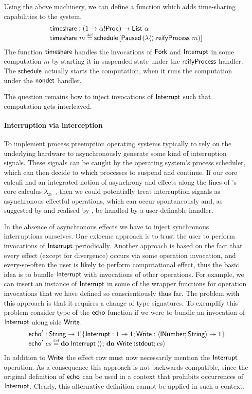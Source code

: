 \documentclass[12pt,phd,lfcs,twoside,openright,logo,leftchapter,normalheadings]{infthesis}
\theoremstyle{plain}
\theoremstyle{definition}
\begin{document}
%
Using the above machinery, we can define a function which adds
time-sharing capabilities to the system.
%
\[
  \bl
     \timeshare : (\UnitType \to \alpha \eff \Proc) \to \List~\alpha\\
     \timeshare~m \defas \schedule\,[\Suspended\,(\lambda\Unit.\reifyP~m)]
  \el
\]
%
The function $\mathsf{timeshare}$ handles the invocations of $\mathsf{Fork}$ and
$\mathsf{Interrupt}$ in some computation $m$ by starting it in suspended state
under the $\mathsf{reifyProcess}$ handler. The $\mathsf{schedule}$ actually starts the
computation, when it runs the computation under the $\mathsf{nondet}$ handler.
%

The question remains how to inject invocations of $\mathsf{Interrupt}$ such
that computation gets interleaved.

\paragraph{Interruption via interception}
%
To implement process preemption operating systems typically to rely on
the underlying hardware to asynchronously generate some kind of
interruption signals. These signals can be caught by the operating
system's process scheduler, which can then decide to which processes
to suspend and continue.
%
If our core calculi had an integrated notion of asynchrony and effects
along the lines of \citeauthor{AhmanP20}'s core calculus
$\lambda_{\text{\ae}}$~\cite{AhmanP20}, then we could potentially
treat interruption signals as asynchronous effectful operations, which
can occur spontaneously and, as suggested by \citet{DolanEHMSW17} and
realised by \citet{Poulson20}, be handled by a user-definable handler.
%

In the absence of asynchronous effects we have to inject synchronous
interruptions ourselves.
%
One extreme approach is to trust the user to perform invocations of
$\mathsf{Interrupt}$ periodically.
%
Another approach is based on the fact that every effect (except for
divergence) occurs via some operation invocation, and every-so-often
the user is likely to perform computational effect, thus the basic
idea is to bundle $\mathsf{Interrupt}$ with invocations of other
operations. For example, we can insert an instance of $\mathsf{Interrupt}$ in
some of the wrapper functions for operation invocations that we have
defined so conscientiously thus far. The problem with this approach is
that it requires a change of type signatures. To exemplify this
problem consider type of the $\mathsf{echo}$ function if we were to bundle an
invocation of $\mathsf{Interrupt}$ along side $\mathsf{Write}$.
%
\[
  \bl
    \echo' : \String \to \UnitType \eff \{\Interrupt : \UnitType \opto \UnitType;\Write : \Record{\UFD;\String} \opto \UnitType\}\\
    \echo'~cs \defas \Do\;\Interrupt\,\Unit;\,\Do\;\Write\,\Record{\stdout;cs}
  \el
\]
%
In addition to $\mathsf{Write}$ the effect row must now necessarily mention
the $\mathsf{Interrupt}$ operation. As a consequence this approach is not
backwards compatible, since the original definition of $\mathsf{echo}$ can be
used in a context that prohibits occurrences of $\mathsf{Interrupt}$. Clearly,
this alternative definition cannot be applied in such a context.
\end{document}
